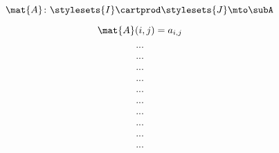 \begin{forslides}
    \begin{equation}
        \label{eq:slides_enrichment_74}
      \mat{A} \colon \stylesets{I} \cartprod \stylesets{J} \mto \subA 
    \end{equation}
    
    \begin{equation}
        \label{eq:slides_enrichment_75}
      \mat{A}(i, j) = a_{i,j}
    \end{equation}
    
    \begin{equation}
        \label{eq:slides_enrichment_76}
      ...
    \end{equation}
    
    \begin{equation}
        \label{eq:slides_enrichment_77}
      ...
    \end{equation}
    
    \begin{equation}
        \label{eq:slides_enrichment_78}
      ...
    \end{equation}
    
    \begin{equation}
        \label{eq:slides_enrichment_79}
      ...
    \end{equation}
    
    \begin{equation}
        \label{eq:slides_enrichment_80}
      ...
    \end{equation}
    
    \begin{equation}
        \label{eq:slides_enrichment_81}
      ...
    \end{equation}
    
    \begin{equation}
        \label{eq:slides_enrichment_82}
      ...
    \end{equation}
    
    \begin{equation}
        \label{eq:slides_enrichment_83}
      ...
    \end{equation}
    
    \begin{equation}
        \label{eq:slides_enrichment_84}
      ...
    \end{equation}
    
    \begin{equation}
        \label{eq:slides_enrichment_85}
      ...
    \end{equation}
    

\end{forslides}
